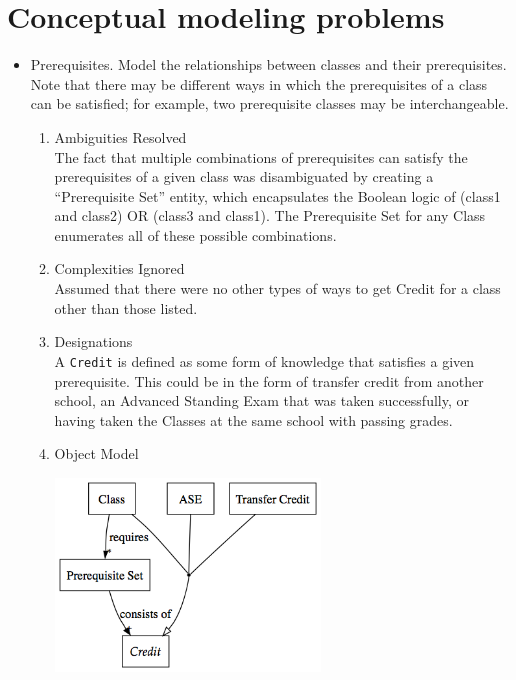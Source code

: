 \documentclass[11pt,letterpaper]{article}
\begin{document}
\section{Conceptual modeling problems}
\begin{itemize}
\item Prerequisites. Model the relationships between classes and their prerequisites. Note that there may be different ways in which the prerequisites of a class can be satisfied; for example, two prerequisite classes may be interchangeable.\\

\begin{enumerate}
\item Ambiguities Resolved\\
The fact that multiple combinations of prerequisites can satisfy the prerequisites of a given class was disambiguated by creating a ``Prerequisite Set'' entity, which encapsulates the Boolean logic of (class1 and class2) OR (class3 and class1). The Prerequisite Set for any Class enumerates all of these possible combinations.

\item Complexities Ignored\\
Assumed that there were no other types of ways to get Credit for a class other than those listed.

\item Designations\\
A \texttt{Credit} is defined as some form of knowledge that satisfies a given prerequisite. This could be in the form of transfer credit from another school, an Advanced Standing Exam that was taken successfully, or having taken the Classes at the same school with passing grades.


\item Object Model\\
\begin{center}
\includegraphics[width=200pt]{dot/b1.png}
\label{fig:ob1} 
\end{center}
\end{enumerate}


\end{itemize}
\end{document}
